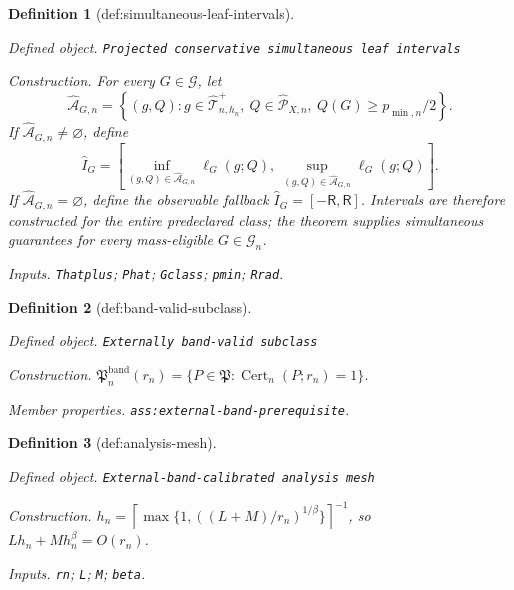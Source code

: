 \documentclass{article}
\newtheorem{definition}{Definition}
\begin{document}
\begin{definition}[def:simultaneous-leaf-intervals]\label{def:simultaneous-leaf-intervals}
\par\smallskip\noindent\emph{Defined object.} \texttt{Projected conservative simultaneous leaf intervals}
\par\smallskip\noindent\emph{Construction.} For every \(G\in\mathcal G\), let
\[
\widehat{\mathcal A}_{G,n}
=\left\{(g,Q):g\in\widehat{\mathcal T}_{n,h_n}^{+},\
Q\in\widehat{\mathcal P}_{X,n},\ Q(G)\geq p_{\min,n}/2\right\}.
\]
If \(\widehat{\mathcal A}_{G,n}\neq\varnothing\), define
\[
\widehat I_G=
\left[
\inf_{(g,Q)\in\widehat{\mathcal A}_{G,n}}\ell_G(g;Q),
\ \sup_{(g,Q)\in\widehat{\mathcal A}_{G,n}}\ell_G(g;Q)
\right].
\]
If \(\widehat{\mathcal A}_{G,n}=\varnothing\), define the observable fallback \(\widehat I_G=[-\mathsf R,\mathsf R]\).  Intervals are therefore constructed for the entire predeclared class; the theorem supplies simultaneous guarantees for every mass-eligible \(G\in\mathcal G_n\).
\par\smallskip\noindent\emph{Inputs.} \texttt{Thatplus}; \texttt{Phat}; \texttt{Gclass}; \texttt{pmin}; \texttt{Rrad}.
\end{definition}

\begin{definition}[def:band-valid-subclass]\label{def:band-valid-subclass}
\par\smallskip\noindent\emph{Defined object.} \texttt{Externally band-\allowbreak{}valid subclass}
\par\smallskip\noindent\emph{Construction.} \(\mathfrak P_n^{\mathrm{band}}(r_n)=\{P\in\mathfrak P:\operatorname{Cert}_n(P;r_n)=1\}\).
\par\smallskip\noindent\emph{Member properties.} \texttt{ass:\allowbreak{}external-\allowbreak{}band-\allowbreak{}prerequisite}.
\end{definition}

\begin{definition}[def:analysis-mesh]\label{def:analysis-mesh}
\par\smallskip\noindent\emph{Defined object.} \texttt{External-\allowbreak{}band-\allowbreak{}calibrated analysis mesh}
\par\smallskip\noindent\emph{Construction.} \(h_n=\left\lceil\max\{1,((L+M)/r_n)^{1/\beta}\}\right\rceil^{-1}\), so \(Lh_n+Mh_n^\beta=O(r_n)\).
\par\smallskip\noindent\emph{Inputs.} \texttt{rn}; \texttt{L}; \texttt{M}; \texttt{beta}.
\end{definition}
\end{document}
